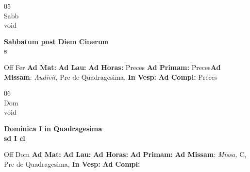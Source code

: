\documentclass[10pt, openany]{book}
\begin{document}
    \begin{center}
        \begin{minipage}{3.5in}
            \vspace{2em}
            \begin{minipage}{0.5in}
                {\Huge 05} \\
                {\normalsize Sabb} \\
                {\normalsize void}
            \end{minipage}
            \begin{minipage}{3.0in}
                \textbf{ \large Sabbatum post Diem Cinerum \\
                \textnormal{\normalsize s}} \\ 
            \end{minipage}
            \begin{justify}Off Fer
                \textbf{Ad Mat: }
                \textbf{Ad Lau: }
                \textbf{Ad Horas: }Preces
                \textbf{Ad Primam: }Preces\textbf{Ad Missam}: \textit{Audivit,} Pre de Quadragesima,  
                \textbf{In Vesp: }
                \textbf{Ad Compl: }Preces
            \end{justify}
        \end{minipage}
    \end{center}

    \begin{center}
        \begin{minipage}{3.5in}
            \vspace{2em}
            \begin{minipage}{0.5in}
                {\Huge 06} \\
                {\normalsize Dom} \\
                {\normalsize void}
            \end{minipage}
            \begin{minipage}{3.0in}
                \textbf{ \large Dominica I in Quadragesima \\
                \textnormal{\normalsize sd I cl}} \\ 
            \end{minipage}
            \begin{justify}Off Dom
                \textbf{Ad Mat: }
                \textbf{Ad Lau: }
                \textbf{Ad Horas: }
                \textbf{Ad Primam: }\textbf{Ad Missam}: \textit{Missa,} C, Pre de Quadragesima,  
                \textbf{In Vesp: }
                \textbf{Ad Compl: }
            \end{justify}
        \end{minipage}
    \end{center}
\end{document}
